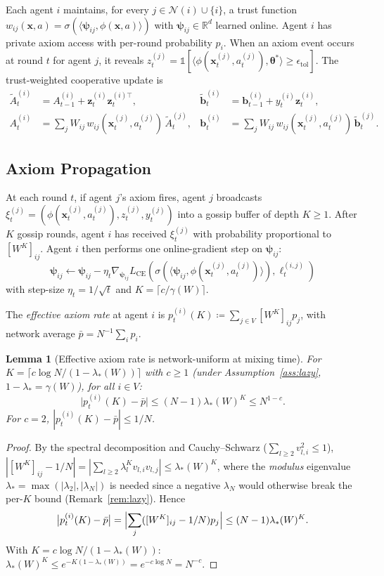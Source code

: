 \documentclass[11pt]{article}
\newtheorem{lemma}[theorem]{Lemma}
\begin{document}
Each agent $i$ maintains, for every $j\in\mathcal{N}(i)\cup\{i\}$,
a trust function
$w_{ij}(\bm{x},a)=\sigma(\langle\bm{\psi}_{ij},\phi(\bm{x},a)\rangle)$
with $\bm{\psi}_{ij}\in\mathbb{R}^d$ learned online.
Agent $i$ has private axiom access with per-round probability $p_i$.
When an axiom event occurs at round $t$ for agent $j$, it reveals
$z_t^{(j)}=\mathbb{1}[\langle\phi(\bm{x}_t^{(j)},a_t^{(j)}),
\bm{\theta}^{\!*}\rangle\geq\epsilon_{\mathrm{tol}}]$.
The trust-weighted cooperative update is
\begin{align*}
\widetilde{A}_t^{(i)}&=A_{t-1}^{(i)}+\bm{z}_t^{(i)}\bm{z}_t^{(i)\top},
&\widetilde{\bm{b}}_t^{(i)}&=\bm{b}_{t-1}^{(i)}+y_t^{(i)}\bm{z}_t^{(i)},\\
A_t^{(i)}&=\sum_j W_{ij}\,w_{ij}(\bm{x}_t^{(j)},a_t^{(j)})\,\widetilde{A}_t^{(j)},
&\bm{b}_t^{(i)}&=\sum_j W_{ij}\,w_{ij}(\bm{x}_t^{(j)},a_t^{(j)})\,\widetilde{\bm{b}}_t^{(j)}.
\end{align*}

\subsection{Axiom Propagation}\label{sec:axiom_prop}

At each round $t$, if agent $j$'s axiom fires, agent $j$ broadcasts
$\xi_t^{(j)}=(\phi(\bm{x}_t^{(j)},a_t^{(j)}),z_t^{(j)},y_t^{(j)})$
into a gossip buffer of depth $K\geq 1$.
After $K$ gossip rounds, agent $i$ has received $\xi_t^{(j)}$ with
probability proportional to $[W^K]_{ij}$.
Agent $i$ then performs one online-gradient step on $\bm{\psi}_{ij}$:
\[
\bm{\psi}_{ij}\leftarrow\bm{\psi}_{ij}
-\eta_t\nabla_{\bm{\psi}_{ij}}L_{\mathrm{CE}}\!\left(
\sigma(\langle\bm{\psi}_{ij},\phi(\bm{x}_t^{(j)},a_t^{(j)})\rangle),
\ell_t^{(i,j)}\right)
\]
with step-size $\eta_t=1/\sqrt{t}$ and $K=\lceil c/\gamma(W)\rceil$.

The \emph{effective axiom rate} at agent $i$ is
$p_t^{(i)}(K)\coloneqq\sum_{j\in V}[W^K]_{ij}p_j$,
with network average $\bar{p}=N^{-1}\sum_i p_i$.

\begin{lemma}[Effective axiom rate is network-uniform at mixing time]
\label{lem:prop}
For $K=\lceil c\log N/(1-\lambda_*(W))\rceil$ with $c\geq 1$
(under Assumption~\ref{ass:lazy}, $1-\lambda_*=\gamma(W)$), for all $i\in V$:
\[
\bigl|p_t^{(i)}(K)-\bar{p}\bigr|
\leq(N-1)\lambda_*(W)^K\leq N^{1-c}.
\]
For $c=2$, $|p_t^{(i)}(K)-\bar{p}|\leq 1/N$.
\end{lemma}

\begin{proof}
By the spectral decomposition and Cauchy--Schwarz
($\sum_{l\geq2}v_{l,i}^2\leq1$),
$|[W^K]_{ij}-1/N|=|\sum_{l\geq2}\lambda_l^K v_{l,i}v_{l,j}|\leq\lambda_*(W)^K$,
where the \emph{modulus} eigenvalue $\lambda_*=\max(|\lambda_2|,|\lambda_N|)$
is needed since a negative $\lambda_N$ would otherwise break the per-$K$
bound (Remark~\ref{rem:lazy}).  Hence
\[
\bigl|p_t^{(i)}(K)-\bar{p}\bigr|
=\Bigl|\sum_j([W^K]_{ij}-1/N)p_j\Bigr|
\leq(N-1)\lambda_*(W)^K.
\]
With $K=c\log N/(1-\lambda_*(W))$:
$\lambda_*(W)^K\leq e^{-K(1-\lambda_*(W))}=e^{-c\log N}=N^{-c}$.
\end{proof}
\end{document}
